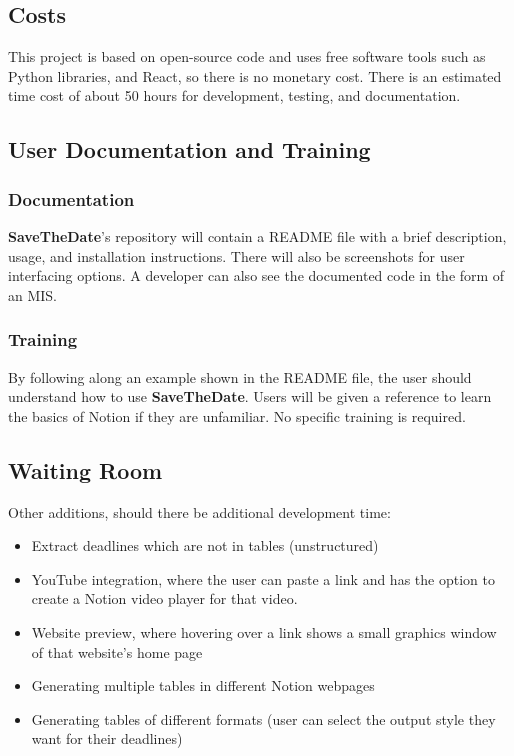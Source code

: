 \documentclass[12pt, titlepage]{article}
\begin{document}
\subsection{Costs}
This project is based on open-source code and uses free software tools such as Python libraries, and React, so there is no monetary cost. There is an estimated time cost of about 50 hours for development, testing, and documentation.

\subsection{User Documentation and Training}

\subsubsection{Documentation}
\textbf{SaveTheDate}’s repository will contain a README file with a brief description, usage, and installation instructions. There will also be screenshots for user interfacing options. A developer can also see the documented code in the form of an MIS.

\subsubsection{Training}
By following along an example shown in the README file, the user should understand how to use \textbf{SaveTheDate}. Users will be given a reference to learn the basics of Notion if they are unfamiliar. No specific training is required.

\subsection{Waiting Room}
Other additions, should there be additional development time:
\begin{itemize}
  \item Extract deadlines which are not in tables (unstructured)
  \item YouTube integration, where the user can paste a link and has the option to create a Notion video player for that video.
  \item Website preview, where hovering over a link shows a small graphics window of that website’s home page
  \item Generating multiple tables in different Notion webpages
  \item Generating tables of different formats (user can select the output style they want for their deadlines)
\end{itemize}
\end{document}
